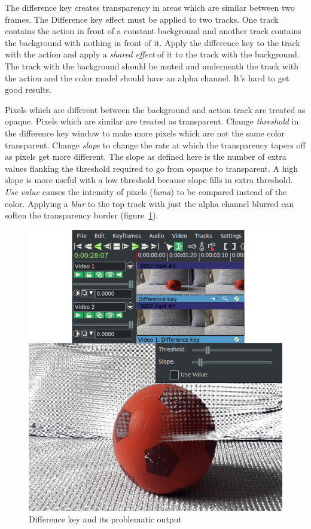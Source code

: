 The difference key creates transparency in areas which are similar between two frames. The Difference key effect must be applied to two tracks. One track contains the action in front of a constant background and another track contains the background with nothing in front of it. Apply the difference key to the track with the action and apply a \textit{shared effect} of it to the track with the background. The track with the background should be muted and underneath the track with the action and the color model should have an alpha channel. It’s hard to get good results.

Pixels which are different between the background and action track are treated as opaque. Pixels which are similar are treated as transparent. Change \textit{threshold} in the difference key window to make more pixels which are not the same color transparent. Change \textit{slope} to change the rate at which the transparency tapers off as pixels get more different. The slope as defined here is the number of extra values flanking the threshold required to go from opaque to transparent. A high slope is more useful with a low threshold because slope fills in extra threshold.
\textit{Use value} causes the intensity of pixels (\textit{luma}) to be compared instead of the color. Applying a \textit{blur} to the top track with just the alpha channel blurred can soften the transparency border (figure~\ref{fig:diff-key}).

\begin{figure}[htpb]
    \centering
    \includegraphics[width=0.8\linewidth]{images/diff-key.png}
    \caption{Difference key and its problematic output}
    \label{fig:diff-key}
\end{figure}

